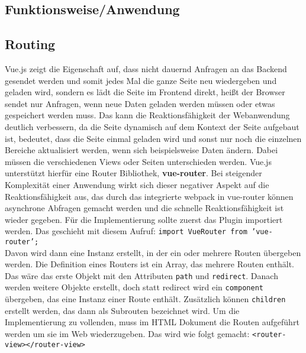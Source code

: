  \subsection{Funktionsweise/Anwendung}
\subsection*{Routing}
Vue.js zeigt die Eigenschaft auf, dass nicht dauernd Anfragen an das Backend gesendet werden und somit jedes Mal die ganze Seite neu wiedergeben und geladen wird, sondern es l\"adt die Seite im Frontend direkt, hei\ss{}t der Browser sendet nur Anfragen, wenn neue Daten geladen werden m\"ussen oder etwas gespeichert werden muss. 
Das kann die Reaktionsf\"ahigkeit der Webanwendung deutlich verbessern, da die Seite dynamisch auf dem Kontext der Seite aufgebaut ist, bedeutet, dass die Seite einmal geladen wird und sonst nur noch die einzelnen Bereiche aktualisiert werden, wenn sich beispielsweise Daten \"andern. Dabei m\"ussen die verschiedenen Views oder Seiten unterschieden werden. Vue.js unterst\"utzt hierf\"ur eine Router Bibliothek, \textbf{vue-router}\cite{Zynda2017}. Bei steigender Komplexit\"at einer Anwendung wirkt sich dieser negativer Aspekt auf die Reaktionsf\"ahigkeit aus, das durch das integrierte webpack in vue-router k\"onnen asynchrone Abfragen gemacht werden und die schnelle Reaktionsf\"ahigkeit ist wieder gegeben.
F\"ur die Implementierung sollte zuerst das Plugin importiert werden. Das geschieht mit diesem Aufruf:
\texttt{import VueRouter from 'vue-router';}\\
Davon wird dann eine Instanz erstellt, in der ein oder mehrere Routen \"ubergeben werden. Die Definition eines Routers ist ein Array, das mehrere Routen enth\"alt. 
Das w\"are das erste Objekt mit den Attributen \texttt{path} und \texttt{redirect}. Danach werden weitere Objekte erstellt, doch statt redirect wird ein \texttt{component} \"ubergeben, das eine Instanz einer Route enth\"alt. Zus\"atzlich k\"onnen \texttt{children} erstellt werden, das dann als Subrouten bezeichnet wird. 
Um die Implementierung zu vollenden, muss im \ac{HTML} Dokument die Routen aufgef\"uhrt werden um sie im Web wiederzugeben. Das wird wie folgt gemacht:  \texttt{<router-view></router-view>}\cite{Bemenderfer2017}

